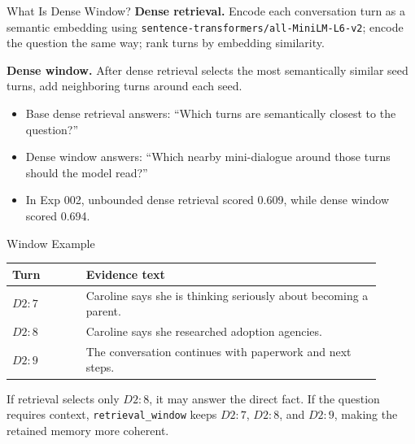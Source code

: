 \documentclass[aspectratio=169]{beamer}
\newcommand{\method}[1]{\texttt{#1}}
\newcommand{\metric}[1]{\textbf{#1}}
\begin{document}
\begin{frame}{What Is Dense Window?}
\metric{Dense retrieval.} Encode each conversation turn as a semantic embedding using \method{sentence-transformers/all-MiniLM-L6-v2}; encode the question the same way; rank turns by embedding similarity.

\vspace{0.5em}
\metric{Dense window.} After dense retrieval selects the most semantically similar seed turns, add neighboring turns around each seed.

\vspace{0.5em}
\begin{itemize}
  \item Base dense retrieval answers: ``Which turns are semantically closest to the question?''
  \item Dense window answers: ``Which nearby mini-dialogue around those turns should the model read?''
  \item In Exp 002, unbounded dense retrieval scored 0.609, while dense window scored 0.694.
\end{itemize}
\end{frame}

\begin{frame}{Window Example}
\begin{tabular}{p{0.18\linewidth}p{0.72\linewidth}}
\toprule
Turn & Evidence text \\
\midrule
\(D2{:}7\) & Caroline says she is thinking seriously about becoming a parent. \\
\(D2{:}8\) & Caroline says she researched adoption agencies. \\
\(D2{:}9\) & The conversation continues with paperwork and next steps. \\
\bottomrule
\end{tabular}

\vspace{0.7em}
If retrieval selects only \(D2{:}8\), it may answer the direct fact. If the question requires context, \method{retrieval\_window} keeps \(D2{:}7\), \(D2{:}8\), and \(D2{:}9\), making the retained memory more coherent.
\end{frame}
\end{document}
